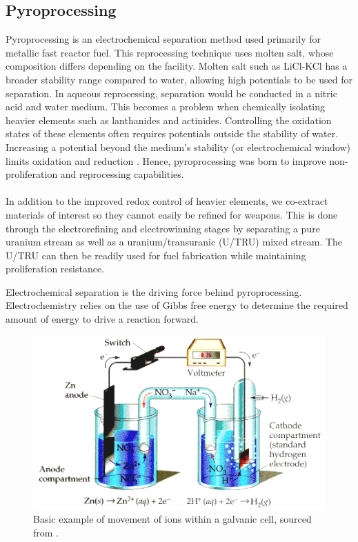 \subsection{Pyroprocessing}
Pyroprocessing is an electrochemical separation method used primarily for metallic fast reactor fuel.
This reprocessing technique uses molten salt, whose composition differs depending on the facility.
Molten salt such as LiCl-KCl has a broader stability range compared to water, allowing high potentials to be used for separation.
In aqueous reprocessing, separation would be conducted in a nitric acid and water medium.
This becomes a problem when chemically isolating heavier elements such as lanthanides and actinides.
Controlling the oxidation states of these elements often requires potentials outside the stability of water. 
Increasing a potential beyond the medium's stability (or electrochemical window) limits oxidation and reduction \cite{hayyan_investigating_2013}.
Hence, pyroprocessing was born to improve non-proliferation and reprocessing capabilities.
\\ \\
In addition to the improved redox control of heavier elements, we co-extract materials of interest so they cannot easily be refined for weapons.
This is done through the electrorefining and electrowinning stages by separating a pure uranium stream as well as a uranium/transuranic (U/TRU) mixed stream. 
The U/TRU can then be readily used for fuel fabrication while maintaining proliferation resistance.

Electrochemical separation is the driving force behind pyroprocessing. Electrochemistry relies on the use of Gibbs free energy to determine the required amount of energy to drive a reaction forward.

\begin{figure}[h]
	\centering
	\includegraphics[width=0.8\linewidth]{images/electrochem}
	\caption{Basic example of movement of ions within a galvanic cell, sourced from \cite{angel}.}
	\label{fig:electrochem}
\end{figure}

